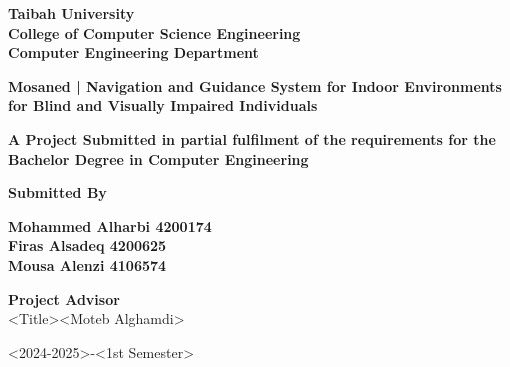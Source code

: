 \begin{titlepage}
    {\titlefont \textbf{Taibah University}}\\
    {\titlefont \textbf{College of Computer Science Engineering}}\\
    {\titlefont \textbf{Computer Engineering Department}}\\
    
    \vspace{1.8cm}
    
    {\titlefont \textbf{Mosaned | Navigation and Guidance System for Indoor Environments for Blind and Visually Impaired Individuals}}
    
    \vspace{1.8cm}

    {\titlefont \fontsize{14}{16} \textbf{A Project Submitted in partial fulfilment of the requirements for the Bachelor Degree in Computer Engineering}}
    \vspace{1.8cm}
    
    {\titlefont \textbf{Submitted By}}\\
    \vspace{1cm}

    {\titlefont \textbf{Mohammed  Alharbi \hspace{4cm} 4200174 }} \\[0.2cm]
    {\titlefont \textbf{Firas Alsadeq \hspace{6cm} 4200625}} \\[0.2cm]
    {\titlefont \textbf{Mousa Alenzi   \hspace{6.2cm} 4106574 }}
    \vspace{1.8cm}

    {\selectfont\fontsize{14}{16}\normalfont
    \textbf{Project Advisor}\\
    \textless Title\textgreater \textless Moteb Alghamdi\textgreater
    }
    
    \vspace{2cm}

    {\selectfont\fontsize{14}{16}\normalfont
    \textless 2024-2025\textgreater-\textless 1st Semester\textgreater
    }

\end{titlepage}
